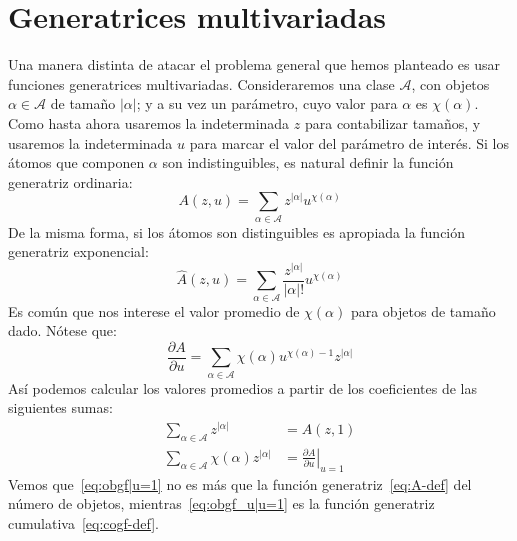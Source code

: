 \section{Generatrices multivariadas}
\label{sec:multivariable-GF}

  Una manera distinta de atacar el problema general que hemos planteado
  es usar funciones generatrices multivariadas.
    Consideraremos una clase \(\mathcal{A}\),
  con objetos \(\alpha \in \mathcal{A}\) de tamaño \(\lvert \alpha \rvert\);
  y a su vez un parámetro,
  cuyo valor para \(\alpha\) es \(\chi(\alpha)\).
  Como hasta ahora usaremos la indeterminada \(z\) para contabilizar tamaños,
  y usaremos la indeterminada \(u\)
  para marcar el valor del parámetro de interés.
  Si los átomos que componen \(\alpha\) son indistinguibles,
  es natural definir la función generatriz ordinaria:
  \begin{equation}
    \label{eq:obgf-def}
    A(z, u)
      = \sum_{\alpha \in \mathcal{A}} z^{\lvert \alpha \rvert} u^{\chi(\alpha)}
  \end{equation}
  De la misma forma,
  si los átomos son distinguibles
  es apropiada la función generatriz exponencial:
  \begin{equation}
    \label{eq:ebgf-def}
    \widehat{A}(z, u)
      = \sum_{\alpha \in \mathcal{A}}
	  \frac{z^{\lvert \alpha \rvert}}{\lvert \alpha \rvert !}
	     u^{\chi(\alpha)}
  \end{equation}
  Es común que nos interese el valor promedio de \(\chi(\alpha)\)
  para objetos de tamaño dado.%
  Nótese que:
  \begin{equation}
    \label{eq:obgf-partial}
    \frac{\partial A}{\partial u}
      = \sum_{\alpha \in \mathcal{A}}
	  \chi(\alpha) u^{\chi(\alpha) - 1} z^{\lvert \alpha \rvert}
  \end{equation}
  Así podemos calcular los valores promedios a partir de
  los coeficientes de las siguientes sumas:
  \begin{align}
    \sum_{\alpha \in \mathcal{A}} z^{\lvert \alpha \rvert}
      &= A(z, 1)
	  \label{eq:obgf|u=1} \\
    \sum_{\alpha \in \mathcal{A}} \chi(\alpha) z^{\lvert \alpha \rvert}
      &= \left. \frac{\partial A}{\partial u} \right\rvert_{u = 1}
	  \label{eq:obgf_u|u=1}
  \end{align}
  Vemos que~\eqref{eq:obgf|u=1}
  no es más que la función generatriz~\eqref{eq:A-def}
  del número de objetos,
  mientras~\eqref{eq:obgf_u|u=1}
  es la función generatriz cumulativa~\eqref{eq:cogf-def}.

